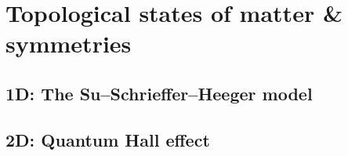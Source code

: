 \chapter[Topological states of matter]{Topological states of matter \& symmetries}	

\section{1D: The Su--Schrieffer--Heeger model}

\section{2D: Quantum Hall effect}